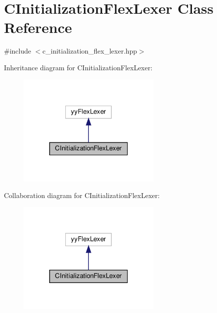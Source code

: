 \hypertarget{classCInitializationFlexLexer}{}\section{C\+Initialization\+Flex\+Lexer Class Reference}
\label{classCInitializationFlexLexer}


{\ttfamily \#include $<$c\+\_\+initialization\+\_\+flex\+\_\+lexer.\+hpp$>$}



Inheritance diagram for C\+Initialization\+Flex\+Lexer\+:
\nopagebreak
\begin{figure}[H]
\begin{center}
\leavevmode
\includegraphics[width=199pt]{db/de5/classCInitializationFlexLexer__inherit__graph}
\end{center}
\end{figure}


Collaboration diagram for C\+Initialization\+Flex\+Lexer\+:
\nopagebreak
\begin{figure}[H]
\begin{center}
\leavevmode
\includegraphics[width=199pt]{d4/de4/classCInitializationFlexLexer__coll__graph}
\end{center}
\end{figure}
